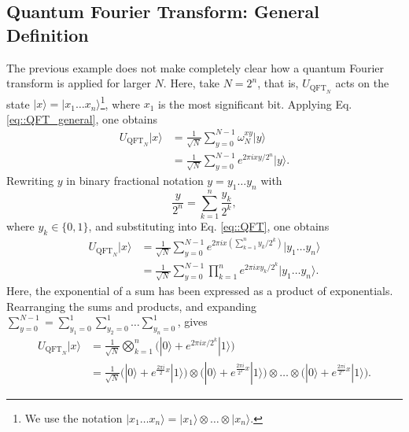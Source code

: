\documentclass[a4paper]{article}
\begin{document}
\subsection{Quantum Fourier Transform: General Definition}
The previous example does not make completely clear how a quantum Fourier transform is applied for larger $N$. Here, take $N=2^n$, that is, $U_{\text{QFT}_N}$ acts on the state $|x\rangle=|x_1\ldots x_n\rangle$\footnote{We use the notation $|x_1\ldots x_n\rangle=|x_1\rangle\otimes\ldots\otimes |x_n\rangle$.}, where $x_1$ is the most significant bit. Applying Eq. \ref{eq::QFT_general}, one obtains
\begin{equation}\label{eq::QFT}
\begin{aligned}
U_{\text{QFT}_N}|x\rangle &=\frac{1}{\sqrt{N}}\sum_{y=0}^{N-1}\omega_N^{xy}|y\rangle\\
&=\frac{1}{\sqrt{N}}\sum_{y=0}^{N-1} e^{2\pi i xy/2^{n}}|y\rangle.
\end{aligned}
\end{equation}
Rewriting $y$ in binary fractional notation $y=y_1\ldots y_n$ with
\begin{equation*}
\frac{y}{2^n}=\sum_{k=1}^{n}\frac{y_k}{2^k},
\end{equation*}
where $y_k \in\{ 0, 1 \}$, and substituting into Eq. \ref{eq::QFT}, one obtains
\begin{equation}\label{eq::QFT_2}
\begin{aligned}
U_{\text{QFT}_N}|x\rangle &=\frac{1}{\sqrt{N}}\sum_{y=0}^{N-1}e^{2\pi i x(\sum_{k=1}^n y_k/2^k)}|y_1 \ldots y_n\rangle\\
&=\frac{1}{\sqrt{N}}\sum_{y=0}^{N-1} \prod_{k=1}^n e^{2\pi i x y_k/2^{k}}|y_1 \ldots y_n\rangle.
\end{aligned}
\end{equation}
Here, the exponential of a sum has been expressed as a product of exponentials. Rearranging the sums and products, and expanding $\sum_{y=0}^{N-1}=\sum_{y_1=0}^1 \sum_{y_2=0}^1 \ldots \sum_{y_n=0}^1$, gives
\begin{equation}\label{eq::QFT_3}
\begin{aligned}
U_{\text{QFT}_N}|x\rangle &=\frac{1}{\sqrt{N}} \bigotimes_{k=1}^n \bigg(|0\rangle + e^{2\pi i x/2^k}|1\rangle \bigg)  \\
&=\frac{1}{\sqrt{N}}\bigg(|0\rangle + e^{\frac{2\pi i}{2} x} |1\rangle \bigg)\otimes\bigg(|0\rangle + e^{\frac{2\pi i}{2^2} x} |1\rangle \bigg)\otimes \ldots \otimes \bigg(|0\rangle + e^{\frac{2\pi i}{2^{n}} x} |1\rangle \bigg).
\end{aligned}
\end{equation}
\end{document}
